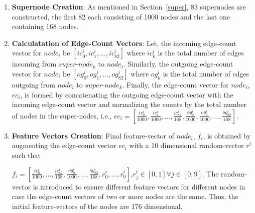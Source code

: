 
\begin{enumerate}
\item \textbf{Supernode Creation}: As mentioned in Section~\ref{super}, 83 supernodes are constructed, the first 82 each consisting of 1000 nodes and the last one containing 168 nodes.


\item \textbf{Calculatation of Edge-Count Vectors}: Let, the incoming edge-count vector for $node_i$ be $[ic_0^i, ic_1^i, \dots , ic_{82}^i]$ where $ic_k^i$ is the total number of edges incoming from $super$-$node_k$ to $node_i$. Similarly, the outgoing edge-count vector for $node_i$ be $[og_0^i, og_1^i, \dots , og_{82}^i]$ where $og_k^i$ is the total number of edges outgoing from $node_i$ to $super$-$node_k$. Finally, the edge-count vector for $node_i$, $ec_i$, is formed by concatenating the outgoing edge-count vector with the incoming edge-count vector and normalizing the counts by the total number of nodes in the super-nodes, i.e., $ec_i=\left[\frac{ic^i_0}{1000}, \frac{ic^i_1}{1000}, \dots , \frac{ic^i_{82}}{168}, \frac{og^i_0}{1000}, \frac{og^i_1}{1000}, \dots , \frac{og_{82}^i}{168}\right]$.
\item \textbf{Feature Vectors Creation}: Final feature-vector of $node_i$, $f_i$, is obtained by augmenting the edge-count vector $ec_i$ with a 10 dimensional random-vector $r^i$ such that

$f_i=\left[\frac{ic^i_0}{1000}, \dots , \frac{ic^i_{82}}{168}, \frac{og^i_0}{1000}, \dots , \frac{og^i_{82}}{168}, r^i_0, \dots , r^i_9\right]$,$r^i_j\in[0,1] \forall j\in[0,9]$. The random-vector is introduced to ensure different feature vectors for different nodes in case the edge-count vectors of two or more nodes are the same. Thus, the initial feature-vectors of the nodes are 176 dimensional.
\end{enumerate}

